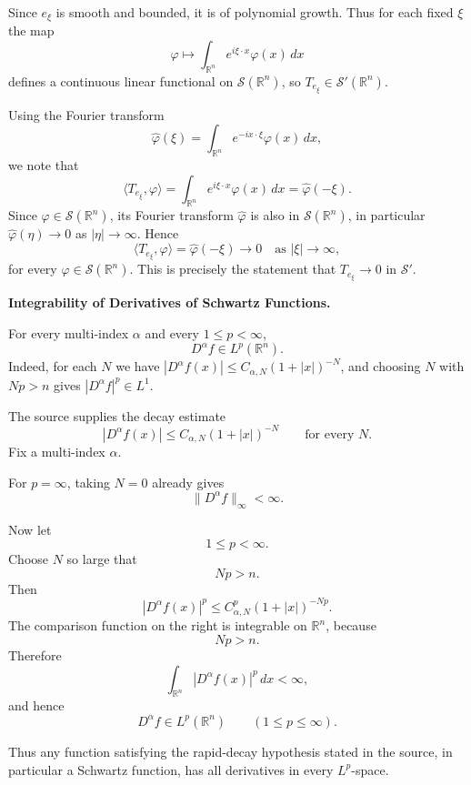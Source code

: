 \begin{solution}
Since $e_\xi$ is smooth and bounded, it is of polynomial growth. Thus
for each fixed $\xi$ the map
\[
\varphi\mapsto \int_{\mathbb{R}^n} e^{i\xi\cdot x}\varphi(x)\,dx
\]
defines a continuous linear functional on $\mathcal{S}(\mathbb{R}^n)$,
so $T_{e_\xi}\in\mathcal{S}'(\mathbb{R}^n)$.

Using the Fourier transform
\[
\widehat{\varphi}(\xi)
= \int_{\mathbb{R}^n} e^{-i x\cdot\xi}\varphi(x)\,dx,
\]
we note that
\[
\langle T_{e_\xi},\varphi\rangle
= \int_{\mathbb{R}^n} e^{i\xi\cdot x}\varphi(x)\,dx
= \widehat{\varphi}(-\xi).
\]
Since $\varphi\in\mathcal{S}(\mathbb{R}^n)$, its Fourier transform
$\widehat{\varphi}$ is also in $\mathcal{S}(\mathbb{R}^n)$, in
particular $\widehat{\varphi}(\eta)\to0$ as $|\eta|\to\infty$. Hence
\[
\langle T_{e_\xi},\varphi\rangle = \widehat{\varphi}(-\xi)\to0
\quad\text{as }|\xi|\to\infty,
\]
for every $\varphi\in\mathcal{S}(\mathbb{R}^n)$. This is precisely the
statement that $T_{e_\xi}\to0$ in $\mathcal{S}'$.
\end{solution}

\begin{problem}[CP-II-0045]
\label{prob:cp-ii-0045}
\textbf{Integrability of Derivatives of Schwartz Functions.}

\hspace*{1.5em}For every multi-index $\alpha$ and every $1\le p<\infty$,
	\[
	D^\alpha f\in L^p(\mathbb{R}^n).
	\]
	Indeed, for each $N$ we have
	$|D^\alpha f(x)|\le C_{\alpha,N}(1+|x|)^{-N}$, and choosing
	$N$ with $Np>n$ gives $|D^\alpha f|^p\in L^1$.
\end{problem}

\begin{solution}
The source supplies the decay estimate
\[
|D^\alpha f(x)|
\le
C_{\alpha,N}(1+|x|)^{-N}
\qquad\text{for every }N.
\]
Fix a multi-index \(\alpha\).

For \(p=\infty\), taking \(N=0\) already gives
\[
\|D^\alpha f\|_\infty<\infty.
\]

Now let
\[
1\le p<\infty.
\]
Choose \(N\) so large that
\[
Np>n.
\]
Then
\[
|D^\alpha f(x)|^p
\le
C_{\alpha,N}^p(1+|x|)^{-Np}.
\]
The comparison function on the right is integrable on \(\mathbb R^n\), because
\[
Np>n.
\]
Therefore
\[
\int_{\mathbb R^n}|D^\alpha f(x)|^p\,dx<\infty,
\]
and hence
\[
\boxed{
D^\alpha f\in L^p(\mathbb R^n)
\qquad
(1\le p\le\infty).
}
\]

Thus any function satisfying the rapid-decay hypothesis stated in the source, in particular
a Schwartz function, has all derivatives in every \(L^p\)-space.
\end{solution}


